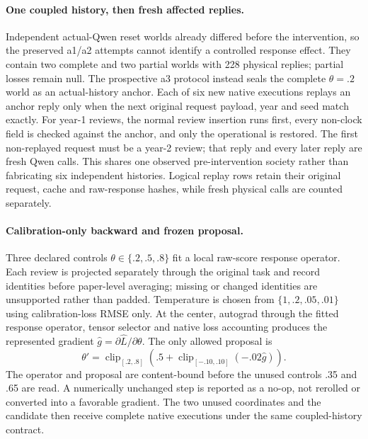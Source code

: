 \paragraph{One coupled history, then fresh affected replies.}
Independent actual-Qwen reset worlds already differed before the intervention,
so the preserved a1/a2 attempts cannot identify a controlled response effect.
They contain two complete and two partial worlds with 228 physical replies;
partial losses remain null.  The prospective a3 protocol instead seals the
complete $\theta=.2$ world as an actual-history anchor.  Each of six new native
executions replays an anchor reply only when the next original request payload,
year and seed match exactly.  For year-1 reviews, the normal review insertion
runs first, every non-clock field is checked against the anchor, and only the
operational  is restored.  The first non-replayed request
must be a year-2 review; that reply and every later reply are fresh Qwen calls.
This shares one observed pre-intervention society rather than fabricating six
independent histories.  Logical replay rows retain their original request,
cache and raw-response hashes, while fresh physical calls are counted
separately.

\paragraph{Calibration-only backward and frozen proposal.}
Three declared controls $\theta\in\{.2,.5,.8\}$ fit a local raw-score response
operator.  Each review is projected separately through the original task and
record identities before paper-level averaging; missing or changed identities
are unsupported rather than padded.  Temperature is chosen from
$\{1,.2,.05,.01\}$ using calibration-loss RMSE only.  At the center, autograd
through the fitted response operator, tensor selector and native loss accounting
produces the represented gradient $\widehat g=\partial\widehat L/\partial\theta$.
The only allowed proposal is
\begin{equation}
 \theta'=\operatorname{clip}_{[.2,.8]}
 \left(.5+\operatorname{clip}_{[-.10,.10]}(-.02\widehat g)\right).
 \label{eq:native-qwen-v9-step}
\end{equation}
The operator and proposal are content-bound before the unused controls .35 and
.65 are read.  A numerically unchanged step is reported as a no-op, not rerolled
or converted into a favorable gradient.  The two unused coordinates and the
candidate then receive complete native executions under the same coupled-history
contract.


